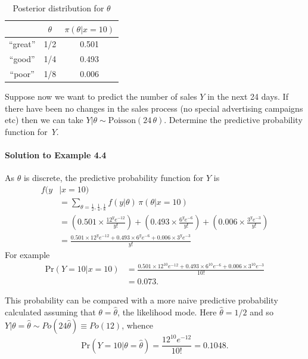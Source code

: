 {\begin{table}[ht]
\begin{tabular}{|c|c|c|}
\cline{2-3}
\multicolumn{1}{c|}{~}& $\theta$ & $\pi(\theta|x=10)$ \\
\hline
``great'' & 1/2 & 0.501 \\
``good''  & 1/4 & 0.493 \\
``poor''  & 1/8 & 0.006 \\
\hline
\end{tabular}
\caption{Posterior distribution for $\theta$}
\label{tab:predpost}

\end{table}

Suppose now we want to predict the number of sales $Y$ in the next 24
days. If there have been no changes in the sales process (no special
advertising campaigns etc) then we can take $Y|\theta\sim
\text{Poisson}(24\,\theta)$. Determine the predictive probability function for~$Y$.

\paragraph{Solution to Example 4.4}{
    
    
    
}

\clearpage

{
    
        As $\theta$ is discrete, the predictive probability
        function for $Y$ is
        \begin{align*}
        f(y&|x=10)\\
        &=\sum_{\theta=\frac{1}{2},\frac{1}{4},\frac{1}{8}} 
        f(y|\theta)\,\pi(\theta|x=10) \\
        &=\left(0.501\times\frac{12^ye^{-12}}{y!}\right) +
        \left(0.493\times\frac{6^ye^{-6}}{y!}\right)+
        \left(0.006\times\frac{3^ye^{-3}}{y!}\right) \\
        &=\frac{0.501\times 12^ye^{-12}+0.493\times 6^ye^{-6}+0.006\times 3^ye^{-3}}
        {y!}
        \end{align*}
        For example
        \begin{align*}
        \text{Pr}(Y=10|x=10)&=
        \frac{0.501\times 12^{10}e^{-12}+0.493\times 6^{10}e^{-6}+
        0.006\times 3^{10}e^{-3}}{10!}\\
        &=0.073.
        \end{align*}
        
    
}

This probability can be compared with a more naive predictive
probability calculated assuming that $\theta=\hat{\theta}$, the
likelihood mode. Here $\hat{\theta}=1/2$ and so $Y|\theta=\hat{\theta}\sim
Po(24\hat{\theta})\equiv Po(12)$, whence
\begin{equation*}
\text{Pr}(Y=10|\theta=\hat{\theta})=\frac{12^{10} e^{-12}}{10!}=0.1048.
\end{equation*}

}
